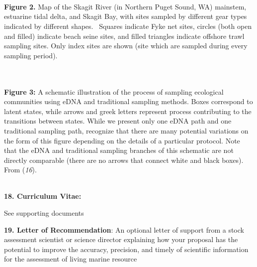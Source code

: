 \documentclass[]{article}
\begin{document}
\emph{}\\

\emph{}\\

\textbf{}

\textbf{}\\

\textbf{Figure 2.} Map of the Skagit River (in Northern Puget Sound, WA)
mainstem, estuarine tidal delta, and Skagit Bay, with sites sampled by
different gear types indicated by different shapes.{~ }Squares indicate
Fyke net sites, circles (both open and filled) indicate beach seine
sites, and filled triangles indicate offshore trawl sampling sites. Only
index sites are shown (site which are sampled during every sampling
period).

\textbf{}\\

\textbf{}\\

\textbf{Figure 3:} A schematic illustration of the process of sampling
ecological communities using eDNA and traditional sampling methods.
Boxes correspond to latent states, while arrows and greek letters
represent process contributing to the transitions between states. While
we present only one eDNA path and one traditional sampling path,
recognize that there are many potential variations on the form of this
figure depending on the details of a particular protocol. Note that the
eDNA and traditional sampling branches of this schematic are not
directly comparable (there are no arrows that connect white and black
boxes). From (\emph{16}).

\textbf{}

\textbf{}\\

\textbf{18. Curriculum Vitae:{~}}

{ }See supporting documents

\textbf{19. Letter of Recommendation}: An optional letter of support
from a stock assessment scientist or science director explaining how
your proposal has the potential to improve the accuracy, precision, and
timely of scientific information for the assessment of living marine
resource{~}

\textbf{}

\textbf{}\\
\end{document}
